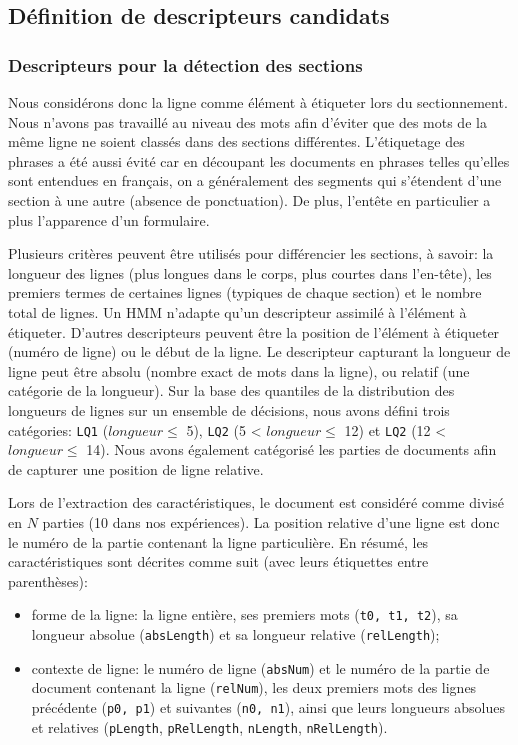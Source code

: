 \subsection{Définition de descripteurs candidats}

\subsubsection{Descripteurs pour la détection des sections}

Nous considérons donc la ligne comme élément à étiqueter lors du sectionnement. Nous n'avons pas travaillé au niveau des mots afin d'éviter que des mots de la même ligne ne soient classés dans des sections différentes. L'étiquetage des phrases a été aussi évité car en découpant les documents en phrases telles qu'elles sont entendues en français, on a généralement des segments qui s'étendent d'une section à une autre (absence de ponctuation). De plus, l'entête en particulier a plus l'apparence d'un formulaire.

Plusieurs critères peuvent être utilisés pour différencier les sections, à savoir: la longueur des lignes (plus longues dans le corps, plus courtes dans l'en-tête), les premiers termes de certaines lignes (typiques de chaque section) et le nombre total de lignes. Un HMM n'adapte qu'un descripteur assimilé à l'élément à étiqueter. D'autres descripteurs peuvent être la position de l'élément à étiqueter (numéro de ligne) ou le début de la ligne. Le descripteur capturant la longueur de ligne peut être absolu (nombre exact de mots dans la ligne), ou relatif (une catégorie de la longueur). Sur la base des quantiles de la distribution des longueurs de lignes sur un ensemble de décisions, nous avons défini trois catégories:
\verb|LQ1| ($longueur \leq$ 5), \verb|LQ2| (5 < $longueur \leq$ 12) et \verb|LQ2| (12 < $longueur \leq$ 14). Nous avons également catégorisé les parties de documents afin de capturer une position de ligne relative.

Lors de l'extraction des caractéristiques, le document est considéré comme divisé en $N$ parties (10 dans nos expériences). La position relative d'une ligne est donc le numéro de la partie contenant la ligne particulière. En résumé, les caractéristiques sont décrites comme suit (avec leurs étiquettes entre parenthèses):
\begin{itemize}
 \item forme de la ligne: la ligne entière, ses premiers mots (\verb|t0, t1, t2|), sa longueur absolue (\verb|absLength|) et sa longueur relative (\verb|relLength|);
 \item contexte de ligne: le numéro de ligne (\verb|absNum|) et le numéro de la partie de document contenant la ligne (\verb|relNum|), les deux premiers mots des lignes précédente (\verb|p0, p1|) et suivantes (\verb|n0, n1|), ainsi que leurs longueurs absolues et relatives
 (\verb|pLength|, \verb|pRelLength|, \verb|nLength|, \verb|nRelLength|).
\end{itemize}


